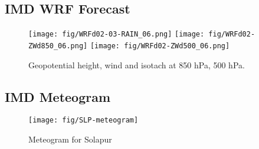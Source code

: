 \documentclass[12pt,a4paper]{article} %
\begin{document}
\subsection*{IMD WRF Forecast}

\begin{figure}[H]
\centering
\texttt{[image: fig/WRFd02-03-RAIN\_06.png]}
\texttt{[image: fig/WRFd02-ZWd850\_06.png]}
\texttt{[image: fig/WRFd02-ZWd500\_06.png]}
\caption{Geopotential height, wind and isotach at 850 hPa, 500 hPa.}
\end{figure}







%




\subsection*{IMD Meteogram}
\begin{figure}[H]
\centering
\texttt{[image: fig/SLP-meteogram]}
\caption{Meteogram for Solapur}
\end{figure}
\end{document}
